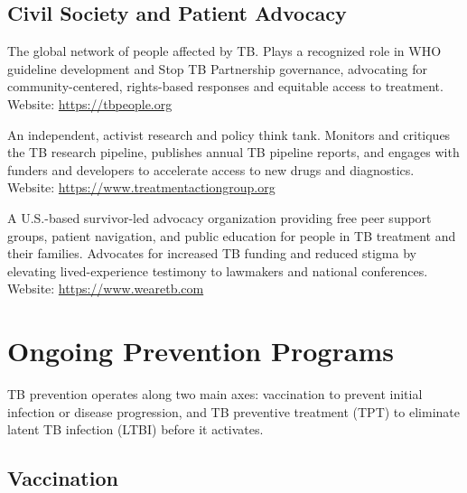 \documentclass[11pt]{article}
\begin{document}
\subsection{Civil Society and Patient Advocacy}

\begin{description}[style=nextline]

  \item[TB People]
  The global network of people affected by TB. Plays a recognized role in WHO guideline development and Stop TB Partnership governance, advocating for community-centered, rights-based responses and equitable access to treatment. \\
  Website: \url{https://tbpeople.org}

  \item[Treatment Action Group (TAG)]
  An independent, activist research and policy think tank. Monitors and critiques the TB research pipeline, publishes annual TB pipeline reports, and engages with funders and developers to accelerate access to new drugs and diagnostics. \\
  Website: \url{https://www.treatmentactiongroup.org}

  \item[We Are TB]
  A U.S.-based survivor-led advocacy organization providing free peer support groups, patient navigation, and public education for people in TB treatment and their families. Advocates for increased TB funding and reduced stigma by elevating lived-experience testimony to lawmakers and national conferences. \\
  Website: \url{https://www.wearetb.com}

\end{description}

\section{Ongoing Prevention Programs}
\label{sec:prevention}

TB prevention operates along two main axes: vaccination to prevent initial infection or disease progression, and TB preventive treatment (TPT) to eliminate latent TB infection (LTBI) before it activates.

\subsection{Vaccination}
\end{document}
